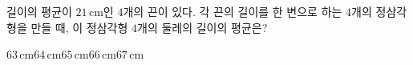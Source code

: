 길이의 평균이 $21\,\mathrm{cm}$인 $4$개의 끈이 있다. 각 끈의 길이를 한 변으로 하는 $4$개의 정삼각형을 만들 때, 이 정삼각형 $4$개의 둘레의 길이의 평균은?
\begin{choices32}{$63\,\mathrm{cm}$}{$64\,\mathrm{cm}$}{$65\,\mathrm{cm}$}{$66\,\mathrm{cm}$}{$67\,\mathrm{cm}$}\end{choices32}
